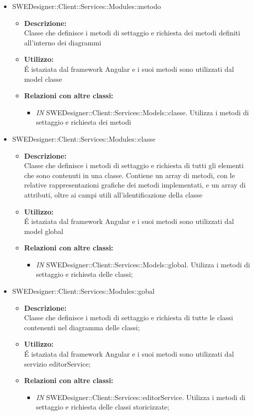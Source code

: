 \begin{itemize}
\begin{itemize}
		\item SWEDesigner::Client::Services::Modules::metodo
		\begin{itemize}
			\item \textbf{Descrizione:}\\
			Classe che definisce i metodi di settaggio e richiesta dei metodi definiti all'interno dei diagrammi
			\item \textbf{Utilizzo:}\\
			É istaziata dal framework Angular e i suoi metodi sono utilizzati dal model classe
			\item \textbf{Relazioni con altre classi: }
			\begin{itemize}
			\item \emph{IN} SWEDesigner::Client::Services::Models::classe. Utilizza i metodi di settaggio e richiesta dei metodi
			\end{itemize}
		\end{itemize}	
		
		\item SWEDesigner::Client::Services::Modules::classe
		\begin{itemize}
			\item \textbf{Descrizione:}\\
			Classe che definisce i metodi di settaggio e richiesta di tutti gli elementi che sono contenuti in una classe. Contiene un array di metodi, con le relative rappresentazioni grafiche dei metodi implementati, e un array di attributi, oltre ai campi utili all'identificazione della classe
			\item \textbf{Utilizzo:}\\
			É istaziata dal framework Angular e i suoi metodi sono utilizzati dal model global
			\item \textbf{Relazioni con altre classi: }
			\begin{itemize}
			\item \emph{IN} SWEDesigner::Client::Services::Models::global. Utilizza i metodi di settaggio e richiesta delle classi;
			\end{itemize}
		\end{itemize}
		
		\item SWEDesigner::Client::Services::Modules::gobal
		\begin{itemize}
			\item \textbf{Descrizione:}\\
			Classe che definisce i metodi di settaggio e richiesta di tutte le classi contenenti nel diagramma delle classi;
			\item \textbf{Utilizzo:}\\
			É istaziata dal framework Angular e i suoi metodi sono utilizzati dal servizio editorService;
			\item \textbf{Relazioni con altre classi: }
			\begin{itemize}
			\item \emph{IN} SWEDesigner::Client::Services::editorService. Utilizza i metodi di settaggio e richiesta delle classi storicizzate;
			\end{itemize}
		\end{itemize}
		

\end{itemize}
\end{itemize}
